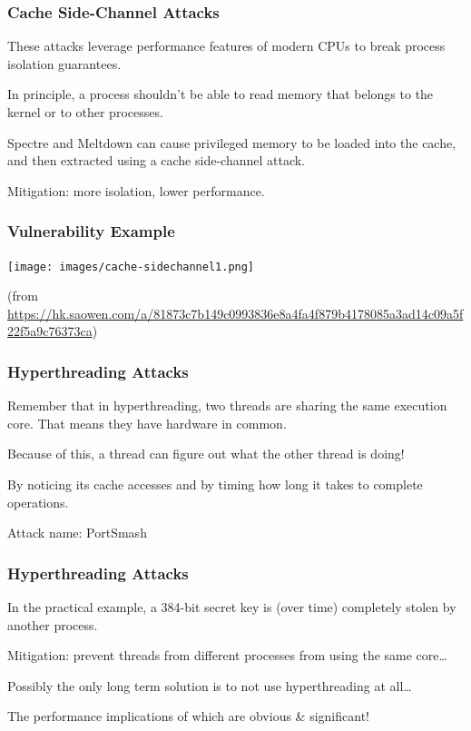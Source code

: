 \begin{frame}
\frametitle{Cache Side-Channel Attacks}

These attacks leverage performance features of modern CPUs to break process isolation guarantees.

In principle, a process shouldn't be able to read memory that belongs to the kernel or to other processes.

Spectre and Meltdown can cause privileged memory to be loaded into the cache, and then extracted using a cache side-channel attack.

Mitigation: more isolation, lower performance.

\end{frame}



\begin{frame}
\frametitle{Vulnerability Example}

\begin{center}
\texttt{[image: images/cache-sidechannel1.png]}
\end{center}
\tiny (from \url{https://hk.saowen.com/a/81873c7b149c0993836e8a4fa4f879b4178085a3ad14c09a5f22f5a9c76373ca})

\end{frame}

\begin{frame}
\frametitle{Hyperthreading Attacks}
Remember that in hyperthreading, two threads are sharing the same execution core. That means they have hardware in common. 

Because of this, a thread can figure out what the other thread is doing!

By noticing its cache accesses and by timing how long it takes to complete operations.

Attack name: PortSmash

\end{frame}

\begin{frame}
\frametitle{Hyperthreading Attacks}
In the practical example, a 384-bit secret key is (over time) completely stolen by another process. 

Mitigation: prevent threads from different processes from using the same core\ldots

Possibly the only long term solution is to not use hyperthreading at all\ldots

The performance implications of which are obvious \& significant!


\end{frame}


